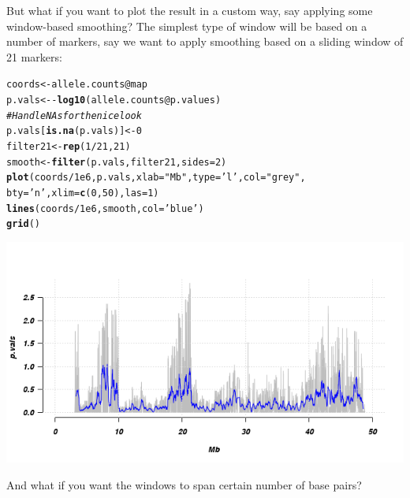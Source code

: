 \documentclass[12pt,a4paper,oneside]{article}\usepackage[]{graphicx}\usepackage[]{color}
\makeatletter
\newcommand{\hlnum}[1]{\textcolor[rgb]{0.686,0.059,0.569}{#1}}%
\newcommand{\hlstr}[1]{\textcolor[rgb]{0.192,0.494,0.8}{#1}}%
\newcommand{\hlcom}[1]{\textcolor[rgb]{0.678,0.584,0.686}{\textit{#1}}}%
\newcommand{\hlopt}[1]{\textcolor[rgb]{0,0,0}{#1}}%
\newcommand{\hlstd}[1]{\textcolor[rgb]{0.345,0.345,0.345}{#1}}%
\newcommand{\hlkwb}[1]{\textcolor[rgb]{0.69,0.353,0.396}{#1}}%
\newcommand{\hlkwc}[1]{\textcolor[rgb]{0.333,0.667,0.333}{#1}}%
\newcommand{\hlkwd}[1]{\textcolor[rgb]{0.737,0.353,0.396}{\textbf{#1}}}%
\newenvironment{kframe}{%
 \def\at@end@of@kframe{}%
 \ifinner\ifhmode%
  \def\at@end@of@kframe{\end{minipage}}%
  \begin{minipage}{\columnwidth}%
 \fi\fi%
 \def\FrameCommand##1{\hskip\@totalleftmargin \hskip-\fboxsep
 \colorbox{shadecolor}{##1}\hskip-\fboxsep
     \hskip-\linewidth \hskip-\@totalleftmargin \hskip\columnwidth}%
 \MakeFramed {\advance\hsize-\width
   \@totalleftmargin\z@ \linewidth\hsize
   \@setminipage}}%
 {\par\unskip\endMakeFramed%
 \at@end@of@kframe}
\newenvironment{knitrout}{}{} %
\makeatother
\begin{document}
But what if you want to plot the result in a custom way, say applying some window-based smoothing? The simplest type of window will be based on a number of markers, say we want to apply smoothing based on a sliding window of 21 markers:
\begin{knitrout}\footnotesize
{}\color{fgcolor}\begin{kframe}
\begin{alltt}
\hlstd{coords} \hlkwb{<-} \hlstd{allele.counts}\hlopt{@}\hlkwc{map}
\hlstd{p.vals} \hlkwb{<-} \hlopt{-}\hlkwd{log10}\hlstd{(allele.counts}\hlopt{@}\hlkwc{p.values}\hlstd{)}
\hlcom{# Handle NAs for the nice look}
\hlstd{p.vals[}\hlkwd{is.na}\hlstd{(p.vals)]} \hlkwb{<-} \hlnum{0}
\hlstd{filter21} \hlkwb{<-} \hlkwd{rep}\hlstd{(}\hlnum{1}\hlopt{/}\hlnum{21}\hlstd{,} \hlnum{21}\hlstd{)}
\hlstd{smooth} \hlkwb{<-} \hlkwd{filter}\hlstd{(p.vals, filter21,} \hlkwc{sides}\hlstd{=}\hlnum{2}\hlstd{)}
\hlkwd{plot}\hlstd{(coords}\hlopt{/}\hlnum{1e6}\hlstd{, p.vals,} \hlkwc{xlab}\hlstd{=}\hlstr{"Mb"}\hlstd{,} \hlkwc{type}\hlstd{=}\hlstr{'l'}\hlstd{,} \hlkwc{col}\hlstd{=}\hlstr{"grey"}\hlstd{,}
     \hlkwc{bty}\hlstd{=}\hlstr{'n'}\hlstd{,} \hlkwc{xlim}\hlstd{=}\hlkwd{c}\hlstd{(}\hlnum{0}\hlstd{,}\hlnum{50}\hlstd{),} \hlkwc{las}\hlstd{=}\hlnum{1}\hlstd{)}
\hlkwd{lines}\hlstd{(coords}\hlopt{/}\hlnum{1e6}\hlstd{, smooth,} \hlkwc{col}\hlstd{=}\hlstr{'blue'}\hlstd{)}
\hlkwd{grid}\hlstd{()}
\end{alltt}
\end{kframe}

{\centering \includegraphics[width=1.0\textwidth]{images/plot_pac_smooth} 

}



\end{knitrout}
And what if you want the windows to span certain number of base pairs?
\end{document}

